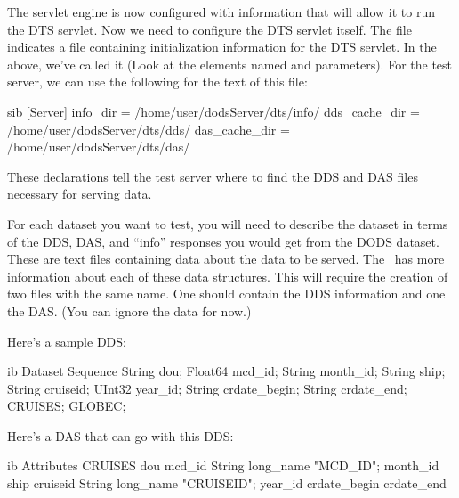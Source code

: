 \documentclass{dods-book}
\begin{document}
The servlet engine is now configured with information that will allow
it to run the DTS servlet. Now we need to configure the DTS servlet
itself. The  file indicates a file containing
initialization information for the DTS servlet. In the above, we've
called it  (Look at the  elements named
 and  parameters). For the test
server, we can use the following for the text of this file:

\begin{vcode}{sib}
[Server]
info_dir      = /home/user/dodsServer/dts/info/
dds_cache_dir = /home/user/dodsServer/dts/dds/
das_cache_dir = /home/user/dodsServer/dts/das/
\end{vcode}

These declarations tell the test server where to find the DDS and DAS
files necessary for serving data.

For each dataset you want to test, you will need to describe the
dataset in terms of the DDS, DAS, and ``info'' responses you would get
from the DODS dataset.  These are text files containing data about the
data to be served.  The \DODSuser\ has more information about each
of these data structures.  This will require the creation of two files
with the same name.  One should contain the DDS information and one
the DAS.  (You can ignore the  data for now.)

Here's a sample DDS:

\begin{vcode}{ib}
Dataset {
  Sequence {
    String dou;
    Float64 mcd_id;
    String month_id;
    String ship;
    String cruiseid;
    UInt32 year_id;
    String crdate_begin;
    String crdate_end;
  } CRUISES;
} GLOBEC;
\end{vcode}

Here's a DAS that can go with this DDS:

\begin{vcode}{ib}
Attributes {
  CRUISES {
    dou {
    }
    mcd_id {
      String long_name "MCD_ID";
    }
    month_id {
    }
    ship {
    }
    cruiseid {
      String long_name "CRUISEID";
    }
    year_id {
    }
    crdate_begin {
    }
    crdate_end {
    }
  }
}
\end{vcode}
\end{document}
